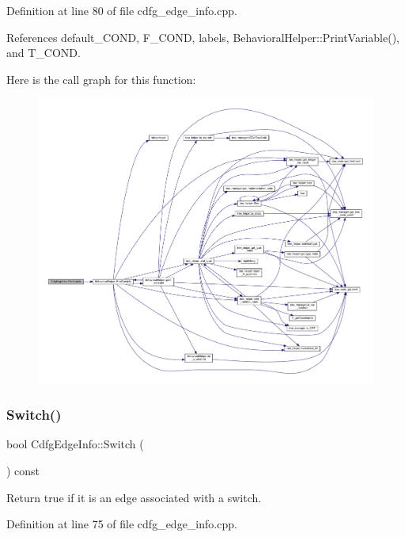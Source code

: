 Definition at line 80 of file cdfg\+\_\+edge\+\_\+info.\+cpp.



References default\+\_\+\+C\+O\+ND, F\+\_\+\+C\+O\+ND, labels, Behavioral\+Helper\+::\+Print\+Variable(), and T\+\_\+\+C\+O\+ND.

Here is the call graph for this function\+:
\nopagebreak
\begin{figure}[H]
\begin{center}
\leavevmode
\includegraphics[width=350pt]{d0/d89/structCdfgEdgeInfo_a505a8d89775aa583b86bf84e5ddb91f9_cgraph}
\end{center}
\end{figure}
\mbox{\label{structCdfgEdgeInfo_a8b1bf37fa377e0c01cb6e813e9df6a66}} 
\subsubsection{\texorpdfstring{Switch()}{Switch()}}
{\footnotesize\ttfamily bool Cdfg\+Edge\+Info\+::\+Switch (\begin{DoxyParamCaption}{ }\end{DoxyParamCaption}) const}



Return true if it is an edge associated with a switch. 



Definition at line 75 of file cdfg\+\_\+edge\+\_\+info.\+cpp.



